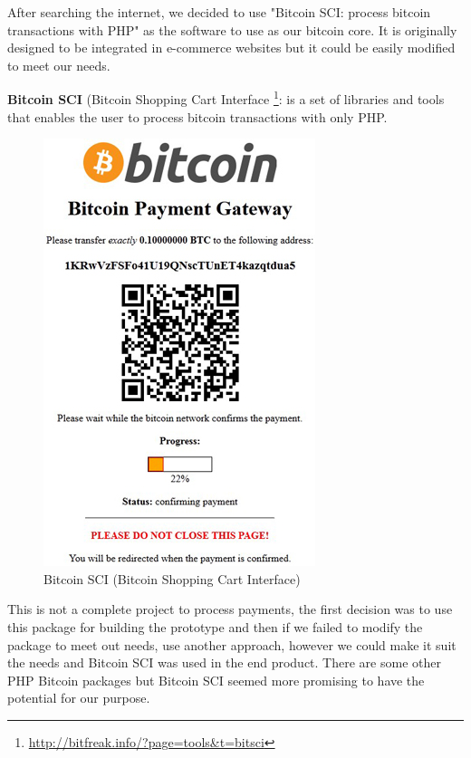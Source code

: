 After searching the internet, we decided to use "Bitcoin SCI: process bitcoin transactions with PHP" as the software to use as our bitcoin core. It is originally designed to be integrated in e-commerce websites but it could be easily modified to meet our needs. 


\textbf{Bitcoin SCI } (Bitcoin Shopping Cart Interface \footnote{\url{http://bitfreak.info/?page=tools&t=bitsci}}: is a set of libraries and tools that enables the user to process bitcoin transactions with only PHP. 

\begin{figure}[h]
\centering
\includegraphics[scale=0.5]{fig/bitsci_screen}
  \caption{Bitcoin SCI (Bitcoin Shopping Cart Interface)}
\label{fig:bitcoin-sci}
\end{figure}


This is not a complete project to process payments, the first decision was to use this package for building the prototype and then if we failed to modify the package to meet out needs, use another approach, however we could make it suit the needs and Bitcoin SCI was used in the end product. There are some other PHP Bitcoin packages but Bitcoin SCI seemed more promising to have the potential for our purpose.

